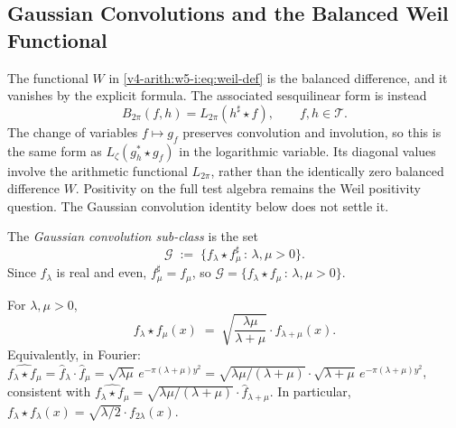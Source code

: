 \subsection{Gaussian Convolutions and the Balanced Weil Functional}
\label{v4-arith:w5-i:positivity-test}

The functional $W$ in \eqref{v4-arith:w5-i:eq:weil-def} is the
balanced difference, and it vanishes by the explicit formula.
The associated sesquilinear form is instead
\[
 B_{2\pi}(f,h)=L_{2\pi}(h^\sharp\star f),\qquad f,h\in\mathcal T.
\]
The change of variables $f\mapsto g_f$ preserves convolution and
involution, so this is the same form as
$L_\zeta(g_h^*\star g_f)$ in the logarithmic variable.
Its diagonal values involve the arithmetic functional $L_{2\pi}$,
rather than the identically zero balanced difference $W$.
Positivity on the full test algebra remains the Weil positivity
question. The Gaussian convolution identity below does not settle it.

\begin{definition}
\label{v4-arith:w5-i:def:gauss-conv-class}
The \emph{Gaussian convolution sub-class}
is the set
\[
\mathcal{G}\;:=\;\{f_{\lambda}\star f_{\mu}^{\sharp}\,:\,\lambda,\mu>0\}.
\]
Since \(f_{\lambda}\) is real and even, \(f_{\mu}^{\sharp}=f_{\mu}\), so
\(\mathcal{G}=\{f_{\lambda}\star f_{\mu}\,:\,\lambda,\mu>0\}\).
\end{definition}

\begin{lemma}
\label{v4-arith:w5-i:lem:gauss-conv}
For \(\lambda,\mu>0\),
\begin{equation}
\label{v4-arith:w5-i:eq:gauss-conv}
f_{\lambda}\star f_{\mu}(x)\;=\;\sqrt{\frac{\lambda\mu}{\lambda+\mu}}\cdot f_{\lambda+\mu}(x).
\end{equation}
Equivalently, in Fourier:
\(\widehat{f_{\lambda}\star f_{\mu}}=\widehat{f}_{\lambda}\cdot\widehat{f}_{\mu}=\sqrt{\lambda\mu}\,e^{-\pi(\lambda+\mu)y^{2}}=\sqrt{\lambda\mu/({\lambda+\mu})}\cdot\sqrt{\lambda+\mu}\,e^{-\pi(\lambda+\mu)y^{2}}\),
consistent with \(\widehat{f_{\lambda}\star f_{\mu}}=\sqrt{\lambda\mu/(\lambda+\mu)}\cdot\widehat{f}_{\lambda+\mu}\). In particular,
\(f_{\lambda}\star f_{\lambda}(x)=\sqrt{\lambda/2}\cdot f_{2\lambda}(x)\).
\end{lemma}

